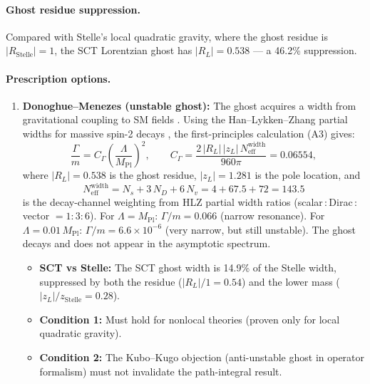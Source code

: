 \documentclass[11pt,a4paper]{article}
\newcommand{\MPl}{M_{\mathrm{Pl}}}
\newcommand{\Neff}{N_{\mathrm{eff}}}
\begin{document}
\paragraph{Ghost residue suppression.}
Compared with Stelle's local quadratic gravity, where the ghost residue
is $|R_{\mathrm{Stelle}}| = 1$, the SCT Lorentzian ghost has
$|R_L| = 0.538$ --- a 46.2\% suppression.

\paragraph{Prescription options.}
\begin{enumerate}[nosep]
  \item \textbf{Donoghue--Menezes (unstable ghost):}
    The ghost acquires a width from gravitational coupling to SM fields
    \cite{Donoghue2019}.  Using the Han--Lykken--Zhang partial widths
    for massive spin-2 decays \cite{HLZ1999}, the first-principles
    calculation (A3) gives:
    \begin{equation}\label{eq:ghost-width}
      \frac{\Gamma}{m}
      = C_{\Gamma}\!\left(\frac{\Lambda}{\MPl}\right)^{\!2},
      \qquad
      C_{\Gamma}
      = \frac{2\,|R_L|\,|z_L|\,\Neff^{\mathrm{width}}}{960\pi}
      = 0.06554,
    \end{equation}
    where $|R_L| = 0.538$ is the ghost residue, $|z_L| = 1.281$ is
    the pole location, and
    \begin{equation}\label{eq:Neff-width}
      \Neff^{\mathrm{width}} = N_s + 3\,N_D + 6\,N_v
      = 4 + 67.5 + 72 = 143.5
    \end{equation}
    is the decay-channel weighting from HLZ partial width ratios
    (scalar\,:\,Dirac\,:\,vector $= 1:3:6$).
    For $\Lambda = \MPl$: $\Gamma/m = 0.066$ (narrow resonance).
    For $\Lambda = 0.01\,\MPl$: $\Gamma/m = 6.6 \times 10^{-6}$
    (very narrow, but still unstable).  The ghost decays and does not
    appear in the asymptotic spectrum.
    \begin{itemize}[nosep]
      \item \textbf{SCT vs Stelle:} The SCT ghost width is 14.9\% of
        the Stelle width, suppressed by both the residue ($|R_L|/1 =
        0.54$) and the lower mass ($|z_L|/z_{\mathrm{Stelle}} = 0.28$).
      \item \textbf{Condition 1:} Must hold for nonlocal theories
        (proven only for local quadratic gravity).
      \item \textbf{Condition 2:} The Kubo--Kugo objection
        \cite{KuboKugo2023} (anti-unstable ghost in operator
        formalism) must not invalidate the path-integral result.
    \end{itemize}


\end{enumerate}
\end{document}
